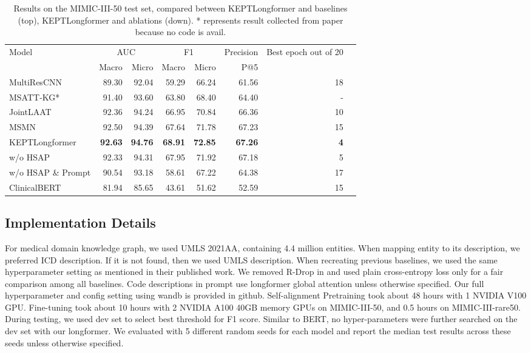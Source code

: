 \documentclass[11pt]{article}
\begin{document}
\begin{table*}
\centering
\begin{tabular}{lrrrrrrr}\toprule
\multirow{2}{*}{Model} &\multicolumn{2}{c}{AUC} &\multicolumn{2}{c}{F1} &Precision &\multirow{2}{*}{Best epoch out of 20} \\\cmidrule{2-6}
&Macro &Micro &Macro &Micro &P@5 & \\\midrule
MultiResCNN &89.30 &92.04 &59.29 &66.24 &61.56 &18 \\
MSATT-KG* &91.40 &93.60 &63.80 &68.40 &64.40 &- \\
JointLAAT &92.36 &94.24 &66.95 &70.84 &66.36 &10 \\
MSMN &92.50 &94.39 &67.64 &71.78 &67.23 &15 \\
\hline
KEPTLongformer &\textbf{92.63} &\textbf{94.76} &\textbf{68.91} &\textbf{72.85} &\textbf{67.26} &\textbf{4} \\
 \hspace{3mm} w/o HSAP &92.33 &94.31 &67.95 &71.92 &67.18 &5 \\ 
 \hspace{3mm} w/o HSAP \& Prompt &90.54 &93.18 &58.61 &67.22 &64.38 &17 \\
ClinicalBERT &81.94 &85.65 &43.61 &51.62 &52.59 &15 \\
\bottomrule
\end{tabular}
\caption{Results on the MIMIC-III-50 test set, compared between KEPTLongformer and baselines (top), KEPTLongformer and ablations (down). * represents result collected from paper because no code is avail.}\label{tab:result_common}
\end{table*}

\subsection{Implementation Details}
For medical domain knowledge graph, we used UMLS 2021AA, containing 4.4 million entities.
When mapping entity to its description, we preferred ICD description. If it is not found, then we used UMLS description.
When recreating previous baselines, we used the same hyperparameter setting as mentioned in their published work. We removed R-Drop in \citep{Yuan2022CodeSD} and used plain cross-entropy loss only for a fair comparison among all baselines. 
Code descriptions in prompt use longformer global attention unless otherwise specified.
Our full hyperparameter and config setting using wandb is provided in github.
Self-alignment Pretraining took about 48 hours with 1 NVIDIA V100 GPU. Fine-tuning took about 10 hours with 2 NVIDIA A100 40GB memory GPUs on MIMIC-III-50, and 0.5 hours on MIMIC-III-rare50. During testing, we used dev set to select best threshold for F1 score. Similar to BERT, no hyper-parameters were further searched on the dev set with our longformer. We evaluated with 5 different random seeds for each model and report the median test results across these seeds unless otherwise specified.
\end{document}
